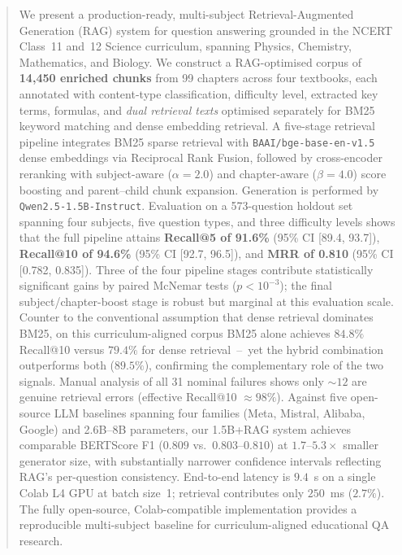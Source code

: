 \documentclass[conference]{IEEEtran}
\begin{document}
\begin{abstract}
We present a production-ready, multi-subject Retrieval-Augmented Generation (RAG) system for question answering grounded in the NCERT Class~11 and~12 Science curriculum, spanning Physics, Chemistry, Mathematics, and Biology. We construct a RAG-optimised corpus of \textbf{14{,}450 enriched chunks} from 99 chapters across four textbooks, each annotated with content-type classification, difficulty level, extracted key terms, formulas, and \emph{dual retrieval texts} optimised separately for BM25 keyword matching and dense embedding retrieval. A five-stage retrieval pipeline integrates BM25 sparse retrieval with \texttt{BAAI/bge-base-en-v1.5} dense embeddings via Reciprocal Rank Fusion, followed by cross-encoder reranking with subject-aware ($\alpha{=}2.0$) and chapter-aware ($\beta{=}4.0$) score boosting and parent--child chunk expansion. Generation is performed by \texttt{Qwen2.5-1.5B-Instruct}. Evaluation on a 573-question holdout set spanning four subjects, five question types, and three difficulty levels shows that the full pipeline attains \textbf{Recall@5 of 91.6\%} (95\% CI [89.4, 93.7]), \textbf{Recall@10 of 94.6\%} (95\% CI [92.7, 96.5]), and \textbf{MRR of 0.810} (95\% CI [0.782, 0.835]). Three of the four pipeline stages contribute statistically significant gains by paired McNemar tests ($p\!<\!10^{-3}$); the final subject/chapter-boost stage is robust but marginal at this evaluation scale. Counter to the conventional assumption that dense retrieval dominates BM25, on this curriculum-aligned corpus BM25 alone achieves $84.8\%$ Recall@10 versus $79.4\%$ for dense retrieval~--~yet the hybrid combination outperforms both ($89.5\%$), confirming the complementary role of the two signals. Manual analysis of all 31 nominal failures shows only ${\sim}12$ are genuine retrieval errors (effective Recall@10 ${\approx}98\%$). Against five open-source LLM baselines spanning four families (Meta, Mistral, Alibaba, Google) and 2.6B--8B parameters, our 1.5B+RAG system achieves comparable BERTScore F1 ($0.809$ vs.\ $0.803$--$0.810$) at $1.7$--$5.3\times$ smaller generator size, with substantially narrower confidence intervals reflecting RAG's per-question consistency. End-to-end latency is $9.4$~s on a single Colab L4 GPU at batch size~1; retrieval contributes only $250$~ms ($2.7\%$). The fully open-source, Colab-compatible implementation provides a reproducible multi-subject baseline for curriculum-aligned educational QA research.
\end{abstract}
\end{document}
